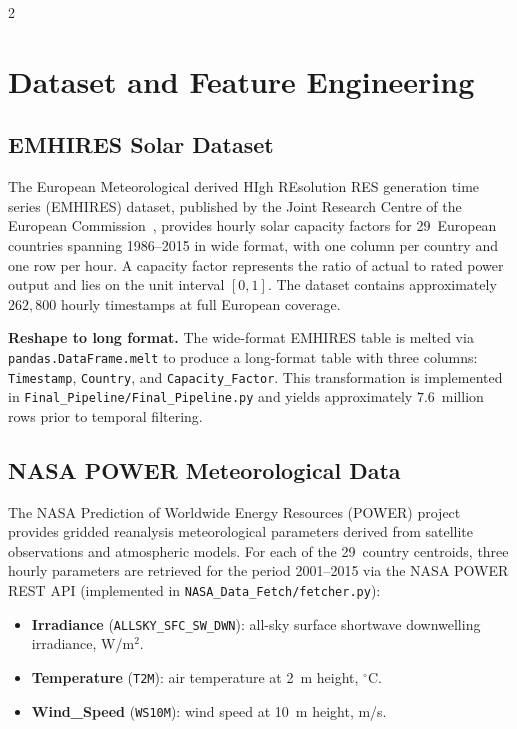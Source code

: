 \documentclass[11pt]{article}
\begin{document}
\begin{multicols}{2}
\section{Dataset and Feature Engineering}

\subsection{EMHIRES Solar Dataset}

The European Meteorological derived HIgh REsolution RES generation time series
(EMHIRES) dataset, published by the Joint Research Centre of the European
Commission~\cite{gonzalez2016}, provides hourly solar capacity factors for
29~European countries spanning 1986--2015 in wide format, with one column per
country and one row per hour. A capacity factor represents the ratio of actual
to rated power output and lies on the unit interval \([0, 1]\). The dataset
contains approximately \(262{,}800\) hourly timestamps at full European coverage.

\textbf{Reshape to long format.} The wide-format EMHIRES table is melted via
\texttt{pandas.DataFrame.melt} to produce a long-format table with three
columns: \texttt{Timestamp}, \texttt{Country}, and \texttt{Capacity\_Factor}.
This transformation is implemented in
\texttt{Final\_Pipeline/Final\_Pipeline.py} and yields approximately
\(7.6\)~million rows prior to temporal filtering.

\subsection{NASA POWER Meteorological Data}

The NASA Prediction of Worldwide Energy Resources (POWER) project~\cite{stackhouse2019}
provides gridded reanalysis meteorological parameters derived from satellite
observations and atmospheric models. For each of the 29~country centroids,
three hourly parameters are retrieved for the period 2001--2015 via the NASA
POWER REST API (implemented in \texttt{NASA\_Data\_Fetch/fetcher.py}):

\begin{itemize}
  \item \textbf{Irradiance} (\texttt{ALLSKY\_SFC\_SW\_DWN}): all-sky surface
        shortwave downwelling irradiance, W/m$^2$.
  \item \textbf{Temperature} (\texttt{T2M}): air temperature at 2~m height, $^\circ$C.
  \item \textbf{Wind\_Speed} (\texttt{WS10M}): wind speed at 10~m height, m/s.
\end{itemize}


\end{multicols}
\end{document}
